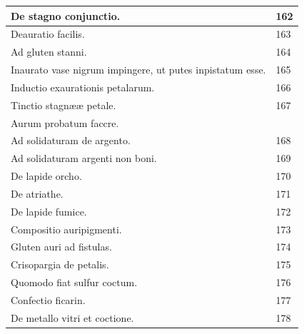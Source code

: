 \documentclass[a4paper, 11pt, oneside, polutonikogreek, italian]{article}
\begin{document}
\begin{center}
\begin{longtable}{|p{60mm}|l|}
         De stagno conjunctio.                                                           & 162 \\ \hline
         Deauratio facilis.                                                              & 163 \\ \hline
         Ad gluten stanni.                                                               & 164 \\ \hline
         Inaurato vase nigrum impingere, ut putes inpistatum esse.                       & 165 \\ \hline
         Inductio exaurationis petalarum.                                                & 166 \\ \hline
         Tinctio stagnææ petale.                                                         & 167 \\ \hline
         Aurum probatum faccre.                                                          & ~ \\ \hline
         Ad solidaturam de argento.                                                      & 168 \\ \hline
         Ad solidaturam argenti non boni.                                                & 169 \\ \hline
         De lapide orcho.                                                                & 170 \\ \hline
         De atriathe.                                                                    & 171 \\ \hline
         De lapide fumice.                                                               & 172 \\ \hline
         Compositio auripigmenti.                                                        & 173 \\ \hline
         Gluten auri ad fistulas.                                                        & 174 \\ \hline
         Crisopargia de petalis.                                                         & 175 \\ \hline
         Quomodo fiat sulfur coctum.                                                     & 176 \\ \hline
         Confectio ficarin.                                                              & 177 \\ \hline
         De metallo vitri et coctione.                                                   & 178 \\ \hline

\end{longtable}
\end{center}
\end{document}
